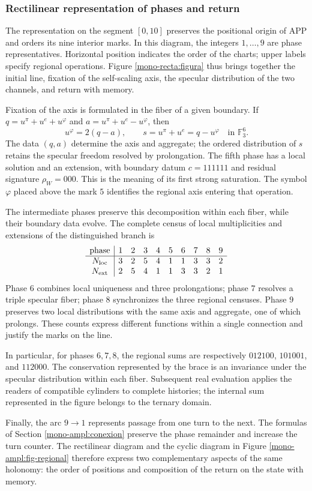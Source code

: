 \clearpage
\subsubsection{Rectilinear representation of phases and return}
\label{mono-recta:desarrollo}

The representation on the segment \([0,10]\) preserves the positional
origin of APP and orders its nine interior marks. In this diagram,
the integers \(1,\ldots,9\) are phase representatives. Horizontal
position indicates the order of the charts; upper labels
specify regional operations. Figure
\ref{mono-recta:figura} thus brings together the initial line, fixation of the
self-scaling axis, the specular distribution of the two channels, and
return with memory.



Fixation of the axis is formulated in the fiber of a given boundary. If
\(q=u^\pi+u^e+u^\varphi\) and
\(a=u^\pi+u^e-u^\varphi\), then
\[
 u^\varphi=2(q-a),\qquad s=u^\pi+u^e=q-u^\varphi
 \quad\text{in }\mathbb F_3^6.
\]
The data \((q,a)\) determine the axis and aggregate; the ordered distribution
of \(s\) retains the specular freedom resolved by prolongation.
The fifth phase has a local solution and an extension, with boundary
datum \(c=111111\) and residual signature \(\rho_W=000\). This is the
meaning of its first strong saturation. The symbol \(\varphi\)
placed above the mark \(5\) identifies the regional axis entering
that operation.

The intermediate phases preserve this decomposition within each fiber,
while their boundary data evolve. The complete census of local
multiplicities and extensions of the distinguished branch is
\[
\begin{array}{c|rrrrrrrrr}
\text{phase}&1&2&3&4&5&6&7&8&9\\\hline
N_{\rm loc}&3&2&5&4&1&1&3&3&2\\
N_{\rm ext}&2&5&4&1&1&3&3&2&1
\end{array}
\]
Phase \(6\) combines local uniqueness and three prolongations; phase
\(7\) resolves a triple specular fiber; phase \(8\) synchronizes
the three regional censuses. Phase \(9\) preserves two local
distributions with the same axis and aggregate, one of which
prolongs. These counts express different functions within a
single connection and justify the marks on the line.

In particular, for phases \(6,7,8\), the regional sums are
respectively \(012100\), \(101001\), and \(112000\). The conservation
represented by the brace is an invariance under the specular
distribution within each fiber. Subsequent real evaluation applies the
readers of compatible cylinders to complete histories; the
internal sum represented in the figure belongs to the ternary domain.

Finally, the arc \(9\to1\) represents passage from one turn to the
next. The formulas of Section
\ref{mono-ampl:conexion} preserve the phase remainder and increase the
turn counter. The rectilinear diagram and the cyclic diagram in
Figure \ref{mono-ampl:fig-regional} therefore express two complementary
aspects of the same holonomy: the order of positions and
composition of the return on the state with memory.

